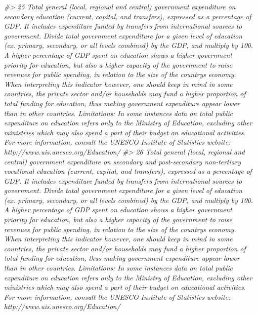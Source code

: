 \documentclass[
  xelatex, ja=standard]{bxjsbook}
\newenvironment{Shaded}{\begin{snugshade}}{\end{snugshade}}
\newcommand{\CommentTok}[1]{\textcolor[rgb]{0.56,0.35,0.01}{\textit{#1}}}
\theoremstyle{definition}
\theoremstyle{definition}
\theoremstyle{definition}
\theoremstyle{definition}
\theoremstyle{remark}
\begin{document}
\begin{Shaded}
\begin{Highlighting}[]
\CommentTok{\#\textgreater{} 25                                                                                                                                                                                           Total general (local, regional and central) government expenditure on secondary education (current, capital, and transfers), expressed as a percentage of GDP. It includes expenditure funded by transfers from international sources to government. Divide total government expenditure for a given level of education (ex. primary, secondary, or all levels combined) by the GDP, and multiply by 100. A higher percentage of GDP spent on education shows a higher government priority for education, but also a higher capacity of the government to raise revenues for public spending, in relation to the size of the country\textquotesingle{}s economy. When interpreting this indicator however, one should keep in mind in some countries, the private sector and/or households may fund a higher proportion of total funding for education, thus making government expenditure appear lower than in other countries. Limitations: In some instances data on total public expenditure on education refers only to the Ministry of Education, excluding other ministries which may also spend a part of their budget on educational activities. For more information, consult the UNESCO Institute of Statistics website: http://www.uis.unesco.org/Education/}
\CommentTok{\#\textgreater{} 26                                                                                                                                                Total general (local, regional and central) government expenditure on secondary and post{-}secondary non{-}tertiary vocational education (current, capital, and transfers), expressed as a percentage of GDP. It includes expenditure funded by transfers from international sources to government. Divide total government expenditure for a given level of education (ex. primary, secondary, or all levels combined) by the GDP, and multiply by 100. A higher percentage of GDP spent on education shows a higher government priority for education, but also a higher capacity of the government to raise revenues for public spending, in relation to the size of the country\textquotesingle{}s economy. When interpreting this indicator however, one should keep in mind in some countries, the private sector and/or households may fund a higher proportion of total funding for education, thus making government expenditure appear lower than in other countries. Limitations: In some instances data on total public expenditure on education refers only to the Ministry of Education, excluding other ministries which may also spend a part of their budget on educational activities. For more information, consult the UNESCO Institute of Statistics website: http://www.uis.unesco.org/Education/}

\end{Highlighting}
\end{Shaded}
\end{document}
